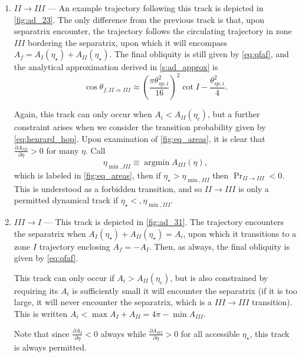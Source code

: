 \documentclass[
        fleqn,
        usenatbib,
        referee,
    ]{mnras}
\newcommand*{\pd}[2]{\frac{\partial#1}{\partial#2}}
\newcommand*{\p}[1]{\left(#1\right)}
\DeclareMathOperator*{\argmin}{argmin}
\begin{document}
\begin{enumerate}
    \item $II \to III$ --- An example trajectory following this track is
        depicted in \autoref{fig:ad_23}. The only difference from the previous
        track is that, upon separatrix encounter, the trajectory follows the
        circulating trajectory in zone $III$ bordering the separatrix, upon
        which it will encompass $A_f = A_I(\eta_\star) + A_{II}(\eta_\star)$.
        The final obliquity is still given by \autoref{eq:qfaf}, and the
        analytical approximation derived in \autoref{s:ad_approx} is
        \begin{equation}
            \cos \theta_{f, II \Rightarrow III} \approx
                \p{\frac{\pi \theta_{sp, i}^2}{16}}^2 \cot I
                    - \frac{\theta_{sp, i}^2}{4}.\label{eq:qf_23_approx}
        \end{equation}

        Again, this track can only occur when $A_i < A_{II}(\eta_c)$, but a
        further constraint arises when we consider the transition probability
        given by \autoref{eq:henrard_hop}. Upon examination of
        \autoref{fig:eq_areas}, it is clear that $\pd{A_{III}}{\eta} > 0$ for
        many $\eta$. Call
        \begin{equation}
            \eta_{\min, III} \equiv \argmin A_{III}(\eta),
        \end{equation}
        which is labeled in \autoref{fig:eq_areas}, then if $\eta_\star >
        \eta_{\min, III}$ then $\Pr_{II \to III} < 0$. This is understood as a
        forbidden transition, and so $II \to III$ is only a permitted dynamical
        track if $\eta_\star <, \eta_{\min, III}$.

    \item $III \to I$ --- This track is depicted in \autoref{fig:ad_31}.
        The trajectory encounters the separatrix when $A_I(\eta_\star) +
        A_{II}(\eta_\star) = A_i$, upon which it transitions to a zone $I$
        trajectory enclosing $A_f = -A_I$. Then, as always, the final obliquity
        is given by \autoref{eq:qfaf}.

        This track can only occur if $A_i > A_{II}(\eta_c)$, but is also
        constrained by requiring its $A_i$ is sufficiently small it will
        encounter the separatrix (if it is too large, it will never encounter
        the separatrix, which is a $III \to III$ transition). This is written
        $A_i < \max A_I + A_{II} = 4\pi - \min A_{III}$.

        Note that since $\pd{A_I}{\eta} < 0$ always while $\pd{A_{III}}{\eta} >
        0$ for all accessible $\eta_{\star}$, this track is always permitted.


\end{enumerate}
\end{document}
